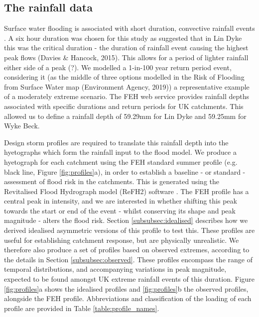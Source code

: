 \documentclass[APA,Times2COL]{WileyNJDv5}
\begin{document}
\subsection{The rainfall data}\label{sec:rainfalldata}
Surface water flooding is associated with short duration, convective rainfall events \citep{rudd2020investigating}. A six hour duration was chosen for this study as \citep{beadle2021} suggested that in Lin Dyke this was the critical duration - the duration of rainfall event causing the highest peak flows (Davies & Hancock, 2015). This allows for a period of lighter rainfall either side of a peak (?). We modelled a 1-in-100 year return period event, considering it (as the middle of three options modelled in the Risk of Flooding from Surface Water map (Environment Agency, 2019)) a representative example of a moderately extreme scenario. The FEH web service provides rainfall depths associated with specific durations and return periods for UK catchments. This allowed us to define a rainfall depth of 59.29mm for Lin Dyke and 59.25mm for Wyke Beck.


Design storm profiles are required to translate this rainfall depth into the hyetographs which form the rainfall input to the flood model. We produce a hyetograph for each catchment using the FEH standard summer profile (e.g. black line, Figure \ref{fig:profiles}a), in order to establish a baseline - or standard - assessment of flood risk in the catchments. This is generated using the Revitalised Flood Hydrograph model (ReFH2) software \citep{kjeldsen2013modelling}. The FEH profile has a central peak in intensity, and we are interested in whether shifting this peak towards the start or end of the event - whilst conserving its shape and peak magnitude -  alters the flood risk. Section \ref{subsubsec:idealised} describes how we derived idealised asymmetric versions of this profile to test this. These profiles are useful for establishing catchment response, but are physically unrealistic. We therefore also produce a set of profiles based on observed extremes, according to the details in Section \ref{subsubsec:observed}. These profiles encompass the range of temporal distributions, and accompanying variations in peak magnitude, expected to be found amongst UK extreme rainfall events of this duration. Figure \ref{fig:profiles}a shows the idealised profiles and \ref{fig:profiles}b the observed profiles, alongside the FEH profile. Abbreviations and classification of the loading of each profile are provided in Table \ref{table:profile_names}. 
\end{document}
